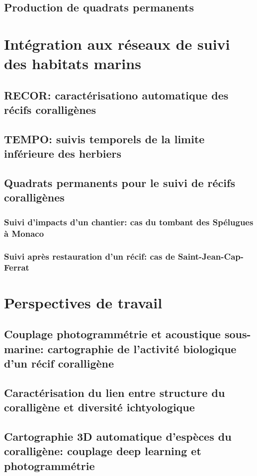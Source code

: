 \subsection{Production de quadrats permanents}
\newpage


\section{Intégration aux réseaux de suivi des habitats marins}\label{discussion.2}
\subsection{RECOR: caractérisationo automatique des récifs coralligènes}
\newpage
\subsection{TEMPO: suivis temporels de la limite inférieure des herbiers}
\newpage

\subsection{Quadrats permanents pour le suivi de récifs coralligènes}
\subsubsection{Suivi d'impacts d'un chantier: cas du tombant des Spélugues à Monaco}
\newpage
\subsubsection{Suivi après restauration d'un récif: cas de Saint-Jean-Cap-Ferrat}
\newpage

\section{Perspectives de travail}\label{discussion.3}
\subsection{Couplage photogrammétrie et acoustique sous-marine: cartographie de l'activité biologique d'un récif coralligène}
\newpage
\subsection{Caractérisation du lien entre structure du coralligène et diversité ichtyologique}
\newpage
\subsection{Cartographie 3D automatique d'espèces du coralligène: couplage deep learning et photogrammétrie}
